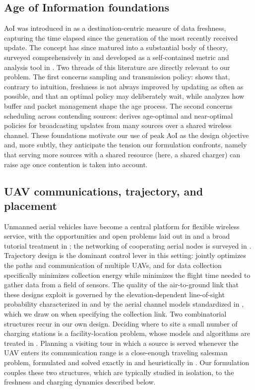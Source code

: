 \subsection{Age of Information foundations}
AoI was introduced in \cite{kaul2012aoi} as a
destination-centric measure of data freshness, capturing the time elapsed
since the generation of the most recently received update. The concept has
since matured into a substantial body of theory, surveyed comprehensively in
\cite{yates2021aoi} and developed as a self-contained metric and analysis tool
in \cite{kosta2017aoi}. Two threads of this literature are directly relevant to
our problem. The first concerns sampling and transmission policy: \cite{sun2017update}
shows that, contrary to intuition, freshness is not always improved by updating
as often as possible, and that an optimal policy may deliberately wait, while
\cite{costa2016age} analyzes how buffer and packet management shape the age
process. The second concerns scheduling across contending sources:
\cite{kadota2018scheduling} derives age-optimal and near-optimal policies for
broadcasting updates from many sources over a shared wireless channel. These
foundations motivate our use of peak AoI as the design objective and, more
subtly, they anticipate the tension our formulation confronts, namely that
serving more sources with a shared resource (here, a shared charger) can raise
age once contention is taken into account.

\subsection{UAV communications, trajectory, and placement}
Unmanned aerial vehicles have become a central platform for flexible wireless
service, with the opportunities and open problems laid out in \cite{zeng2016uav}
and a broad tutorial treatment in \cite{mozaffari2019tutorial}; the networking
of cooperating aerial nodes is surveyed in \cite{bekmezci2013fanet}. Trajectory
design is the dominant control lever in this setting: \cite{wu2018multiuav}
jointly optimizes the paths and communication of multiple UAVs, and for data
collection specifically \cite{zhan2018energy} minimizes collection energy while
\cite{gong2018flight} minimizes the flight time needed to gather data from a
field of sensors. The quality of the air-to-ground link that these designs
exploit is governed by the elevation-dependent line-of-sight probability
characterized in \cite{alhourani2014optimal} and by the aerial channel models
standardized in \cite{tr36777}, which we draw on when specifying the collection
link. Two combinatorial structures recur in our own design. Deciding where to
site a small number of charging stations is a facility-location problem, whose
models and algorithms are treated in \cite{daskin2013}. Planning a visiting tour
in which a source is served whenever the UAV enters its communication range is a
close-enough traveling salesman problem, formulated and solved exactly in
\cite{behdani2014cetsp} and heuristically in \cite{cetsp}. Our formulation
couples these two structures, which are typically studied in isolation, to the
freshness and charging dynamics described below.

